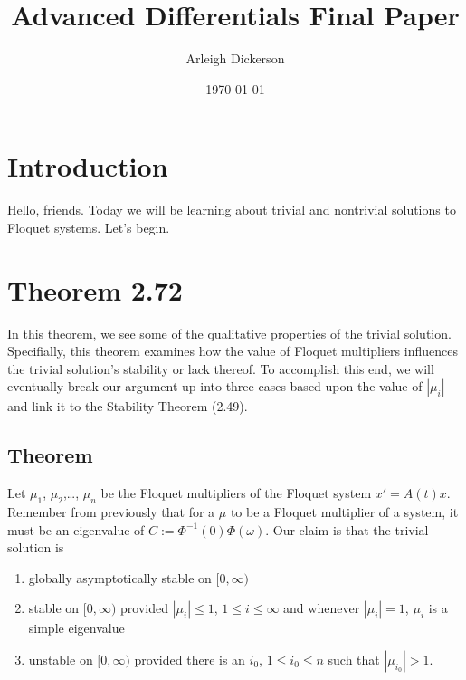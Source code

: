 \documentclass[a4paper]{article}
\title{Advanced Differentials Final Paper}
\author{Arleigh Dickerson}
\date{\today}
\begin{document}
\maketitle

\section{Introduction}
Hello, friends. Today we will be learning about trivial and nontrivial solutions to Floquet systems. Let's begin.
\section{Theorem 2.72}

In this theorem, we see some of the qualitative properties of the trivial solution. Specifially, this theorem examines how the value of Floquet multipliers influences the trivial solution's stability or lack thereof. To accomplish this end, we will eventually break our argument up into three cases based upon the value of $|\mu_i|$ and link it to the Stability Theorem (2.49).

\subsection{Theorem}

Let $\mu_1$, $\mu_2$,\ldots, $\mu_n$ be the Floquet multipliers of the Floquet system $x' = A(t)x$. Remember from previously that for a $\mu$ to be a Floquet multiplier of a system, it must be an eigenvalue of $C := \Phi^{-1}(0)\Phi(\omega)$. Our claim is that the trivial solution is \begin{enumerate}
    \item globally asymptotically stable on $[0,\infty)$
    \item stable on $[0,\infty)$ provided $|\mu_i| \leq 1$, $1 \leq i \leq \infty$ and whenever $|\mu_i| = 1$, $\mu_i$ is a simple eigenvalue
    \item unstable on $[0,\infty)$ provided there is an $i_0$, $1 \leq i_0 \leq n$ such that $|\mu_{i_0}| > 1$.
\end{enumerate}
\end{document}
